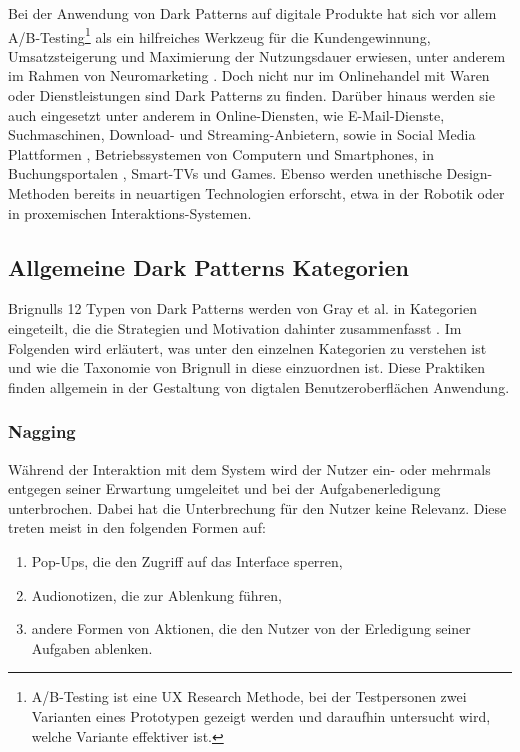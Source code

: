\documentclass[a4paper]{article}
\begin{document}
Bei der Anwendung von Dark Patterns auf digitale Produkte hat sich vor allem A/B-Testing\footnote{\label{foot:1}A/B-Testing ist eine UX Research Methode, bei der Testpersonen zwei Varianten eines Prototypen gezeigt werden und daraufhin untersucht wird, welche Variante effektiver ist.} als ein hilfreiches Werkzeug für die Kundengewinnung, Umsatzsteigerung und Maximierung der Nutzungsdauer erwiesen, unter anderem im Rahmen von Neuromarketing \cite{snv}\cite{narayanan}\cite{tab}. Doch nicht nur im Onlinehandel mit Waren oder Dienstleistungen sind Dark Patterns zu finden. Darüber hinaus werden sie auch eingesetzt unter anderem in Online-Diensten, wie E-Mail-Dienste, Suchmaschinen, Download- und Streaming-Anbietern, sowie in Social Media Plattformen \cite{fastcompany}, Betriebssystemen von Computern und Smartphones, in Buchungsportalen \cite{swr}, Smart-TVs \cite{bundeskartellamt} und Games. Ebenso werden unethische Design-Methoden bereits in neuartigen Technologien erforscht, etwa in der Robotik oder in proxemischen Interaktions-Systemen.  

\subsection{Allgemeine Dark Patterns Kategorien}
\label{sub:dark_patterns_kategorien}
Brignulls 12 Typen von Dark Patterns werden von Gray et al. in Kategorien eingeteilt, die die Strategien und Motivation dahinter zusammenfasst \cite{gray}. 
Im Folgenden wird erläutert, was unter den einzelnen Kategorien zu verstehen ist und wie die Taxonomie von Brignull in diese einzuordnen ist. Diese Praktiken finden allgemein in der Gestaltung von digtalen Benutzeroberflächen Anwendung.

\subsubsection{Nagging}
\label{sssec:nagging}
Während der Interaktion mit dem System wird der Nutzer ein- oder mehrmals entgegen seiner Erwartung umgeleitet und bei der Aufgabenerledigung unterbrochen. Dabei hat die Unterbrechung für den Nutzer keine Relevanz. Diese treten meist in den folgenden Formen auf:
\begin{enumerate}[label=\arabic*)]
	\item{Pop-Ups, die den Zugriff auf das Interface sperren,}
	\item{Audionotizen, die zur Ablenkung führen,}
	\item{andere Formen von Aktionen, die den Nutzer von der Erledigung seiner Aufgaben ablenken.}
\end{enumerate}
\end{document}
